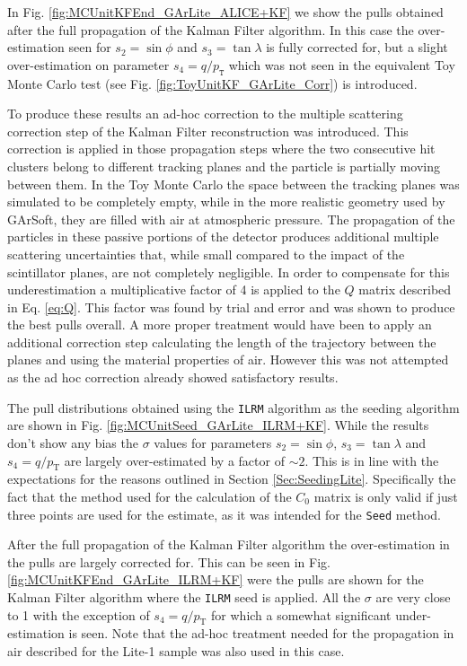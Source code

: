 In Fig. \ref{fig:MCUnitKFEnd_GArLite_ALICE+KF} we show the pulls obtained after the full propagation of the Kalman Filter algorithm. In this case the over-estimation seen for $s_2=\sin\phi$ and $s_3=\tan\lambda$ is fully corrected for, but a slight over-estimation on parameter $s_4=q/p_\texttt{T}$ which was not seen in the equivalent Toy Monte Carlo test (see Fig. \ref{fig:ToyUnitKF_GArLite_Corr}) is introduced. 

To produce these results an ad-hoc correction to the multiple scattering correction step of the Kalman Filter reconstruction was introduced. This correction is applied in those propagation steps where the two consecutive hit clusters belong to different tracking planes and the particle is partially moving between them. In the Toy Monte Carlo the space between the tracking planes was simulated to be completely empty, while in the more realistic geometry used by GArSoft, they are filled with air at atmospheric pressure. The propagation of the particles in these passive portions of the detector produces additional multiple scattering uncertainties that, while small compared to the impact of the scintillator planes, are not completely negligible. In order to compensate for this underestimation a multiplicative factor of 4 is applied to the $Q$ matrix described in Eq. \ref{eq:Q}. This factor was found by trial and error and was shown to produce the best pulls overall. A more proper treatment would have been to apply an additional correction step calculating the length of the trajectory between the planes and using the material properties of air. However this was not attempted as the ad hoc correction already showed satisfactory results. 

The pull distributions obtained using the \texttt{ILRM} algorithm as the seeding algorithm  are shown in Fig. \ref{fig:MCUnitSeed_GArLite_ILRM+KF}. While the results don't show any bias the $\sigma$ values for parameters $s_2=\sin\phi$, $s_3=\tan\lambda$ and $s_4=q/p_\text{T}$ are largely over-estimated by a factor of $\sim2$. This is in line with the expectations for the reasons outlined in Section \ref{Sec:SeedingLite}. Specifically the fact that the method used for the calculation of the $C_0$ matrix is only valid if just three points are used for the estimate, as it was intended for the \texttt{Seed} method. 

After the full propagation of the Kalman Filter algorithm the over-estimation in the pulls are largely corrected for. This can be seen in Fig. \ref{fig:MCUnitKFEnd_GArLite_ILRM+KF} were the pulls are shown for the Kalman Filter algorithm where the \texttt{ILRM} seed is applied. All the $\sigma$ are very close to 1 with the exception of $s_4=q/p_\text{T}$ for which a somewhat significant under-estimation is seen. Note that the ad-hoc treatment needed for the propagation in air described for the Lite-1 sample was also used in this case. 

